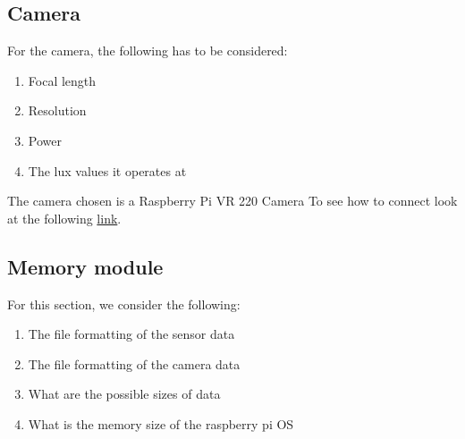 \subsection{Camera}
For the camera,  the following has to be considered:
\begin{enumerate}
	\item Focal length
	\item Resolution
	\item Power
	\item The lux values it operates at
\end{enumerate}
\begin{table}[h!]
	\centering
	\caption{Camera module}
	\label{Camera module}
\end{table}

The camera chosen is a Raspberry Pi VR 220\cite{RS} Camera To see how to connect look at the  following \href{https://youtu.be/yhM1NhD-kGs?si=yxgFZb84yxSGLtM3}{link}. 
\subsection{Memory module}
For this section, we consider the following:
\begin{enumerate}
	\item The file formatting of the sensor data
	\item The file formatting of  the camera data
	\item What are  the possible sizes of data
	\item What is the  memory size of the  raspberry pi OS
\end{enumerate}

